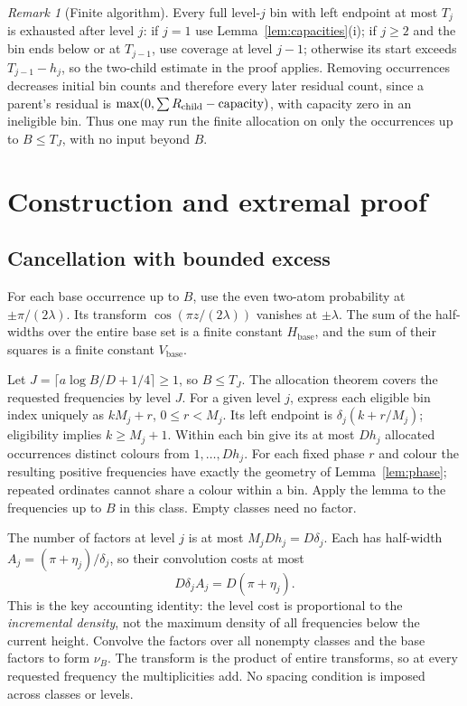 \documentclass[11pt,letterpaper]{article}
\theoremstyle{remark}\newtheorem{remark}[theorem]{Remark}
\begin{document}
\begin{remark}[Finite algorithm]\label{rem:finite}
Every full level-$j$ bin with left endpoint at most $T_j$ is exhausted after level $j$: if $j=1$ use Lemma~\ref{lem:capacities}(i); if $j\ge2$ and the bin ends below or at $T_{j-1}$, use coverage at level $j-1$; otherwise its start exceeds $T_{j-1}-h_j$, so the two-child estimate in the proof applies. Removing occurrences decreases initial bin counts and therefore every later residual count, since a parent's residual is $\max(0,\sum R_{\rm child}-\text{capacity})$, with capacity zero in an ineligible bin. Thus one may run the finite allocation on only the occurrences up to $B\le T_J$, with no input beyond $B$.
\end{remark}

\section{Construction and extremal proof}\label{sec:construct}
\subsection{Cancellation with bounded excess}
For each base occurrence up to $B$, use the even two-atom probability at $\pm\pi/(2\lambda)$. Its transform $\cos(\pi z/(2\lambda))$ vanishes at $\pm\lambda$. The sum of the half-widths over the entire base set is a finite constant $H_\mathrm{base}$, and the sum of their squares is a finite constant $V_\mathrm{base}$.

Let $J=\lceil a\log B/D+1/4\rceil\ge1$, so $B\le T_J$. The allocation theorem covers the requested frequencies by level $J$. For a given level $j$, express each eligible bin index uniquely as $kM_j+r$, $0\le r<M_j$. Its left endpoint is $\delta_j(k+r/M_j)$; eligibility implies $k\ge M_j+1$. Within each bin give its at most $Dh_j$ allocated occurrences distinct colours from $1,\ldots,Dh_j$. For each fixed phase $r$ and colour the resulting positive frequencies have exactly the geometry of Lemma~\ref{lem:phase}; repeated ordinates cannot share a colour within a bin. Apply the lemma to the frequencies up to $B$ in this class. Empty classes need no factor.

The number of factors at level $j$ is at most $M_j D h_j=D\delta_j$. Each has half-width $A_j=(\pi+\eta_j)/\delta_j$, so their convolution costs at most
\begin{equation}\label{eq:levelcost}
 D\delta_j A_j=D(\pi+\eta_j).
\end{equation}
This is the key accounting identity: the level cost is proportional to the \emph{incremental density}, not the maximum density of all frequencies below the current height. Convolve the factors over all nonempty classes and the base factors to form $\nu_B$. The transform is the product of entire transforms, so at every requested frequency the multiplicities add. No spacing condition is imposed across classes or levels.
\end{document}
